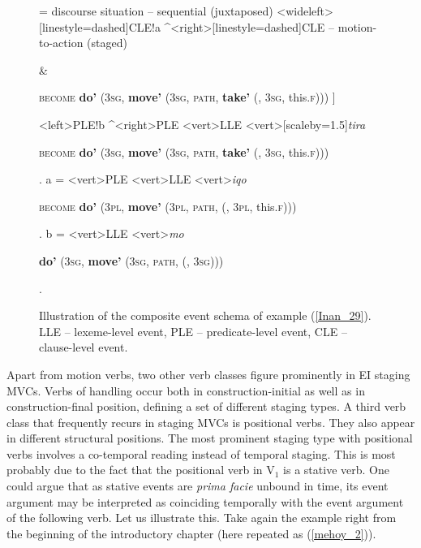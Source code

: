\begin{figure}
\jtree[xunit=7.5em,yunit=2em]
\! = {discourse situation -- sequential (juxtaposed)}
<wideleft>[linestyle=dashed]{CLE}!a ^<right>[linestyle=dashed]{CLE -- motion-to-action (staged)}{\begin{scriptsize} [ \textbf{do'} (3\textsc{sg}, \textbf{move'} (3\textsc{sg}, \textsc{path}, \textbf{\rnode{D1}{come'}} (\rnode{B1}{e$_2$}, 3\textsc{sg})))\end{scriptsize} \&}
{\begin{scriptsize} \textsc{become} \textbf{do'} (3\textsc{sg}, \textbf{move'} (3\textsc{sg}, \textsc{path}, \textbf{take'} (, 3\textsc{sg}, this.\textsc{f}))) ]\end{scriptsize}}
<left>{PLE}!b ^<right>{PLE}
<vert>{LLE}
<vert>[scaleby=1.5]{\textit{tira}}{\begin{scriptsize} \textsc{become} \textbf{do'} (3\textsc{sg}, \textbf{move'} (3\textsc{sg}, \textsc{path}, \textbf{take'} (, 3\textsc{sg}, this.\textsc{f})))\end{scriptsize}}.
\!a = <vert>{PLE}
<vert>{LLE}
<vert>{\textit{iqo}}
{\begin{scriptsize} \textsc{become} \textbf{do'} (3\textsc{pl}, \textbf{move'} (3\textsc{pl}, \textsc{path}, \textbf{} (, 3\textsc{pl}, this.\textsc{f})))\end{scriptsize}}.
\!b = <vert>{LLE}
<vert>{\textit{mo}}
{\begin{scriptsize} \textbf{do'} (3\textsc{sg}, \textbf{move'} (3\textsc{sg}, \textsc{path}, \textbf{} (, 3\textsc{sg})))\end{scriptsize}}.
\endjtree

\caption[Event schema illustration of example (\ref{Inan_29})]{Illustration of the composite event schema of example (\ref{Inan_29}). LLE -- lexeme-level event, PLE -- predicate-level event, CLE -- clause-level event.}
\label{figure:eventschema_Inan29}
\end{figure}

Apart from motion verbs, two other verb classes figure prominently in EI staging MVCs. Verbs of handling occur both in construction-initial as well as in construction-final position, defining a set of different staging types. A third verb class that frequently recurs in staging MVCs is positional verbs. They also appear in different structural positions. The most prominent staging type with positional verbs involves a co-temporal reading instead of temporal staging. This is most probably due to the fact that the positional verb in V$_1$ is a stative verb. One could argue that as stative events are \textit{prima facie} unbound in time, its event argument may be interpreted as coinciding temporally with the event argument of the following verb. Let us illustrate this. Take again the  example right from the beginning of the introductory chapter (here repeated as (\ref{mehoy_2})).

